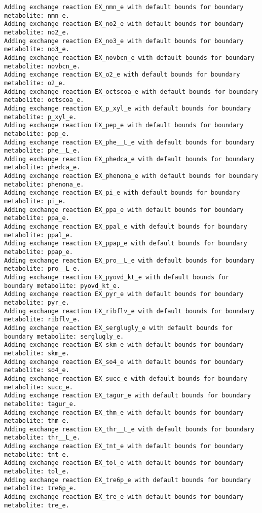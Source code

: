 \documentclass[
  letterpaper,
  DIV=11,
  numbers=noendperiod]{scrartcl}
\begin{document}
\begin{verbatim}
Adding exchange reaction EX_nmn_e with default bounds for boundary metabolite: nmn_e.
Adding exchange reaction EX_no2_e with default bounds for boundary metabolite: no2_e.
Adding exchange reaction EX_no3_e with default bounds for boundary metabolite: no3_e.
Adding exchange reaction EX_novbcn_e with default bounds for boundary metabolite: novbcn_e.
Adding exchange reaction EX_o2_e with default bounds for boundary metabolite: o2_e.
Adding exchange reaction EX_octscoa_e with default bounds for boundary metabolite: octscoa_e.
Adding exchange reaction EX_p_xyl_e with default bounds for boundary metabolite: p_xyl_e.
Adding exchange reaction EX_pep_e with default bounds for boundary metabolite: pep_e.
Adding exchange reaction EX_phe__L_e with default bounds for boundary metabolite: phe__L_e.
Adding exchange reaction EX_phedca_e with default bounds for boundary metabolite: phedca_e.
Adding exchange reaction EX_phenona_e with default bounds for boundary metabolite: phenona_e.
Adding exchange reaction EX_pi_e with default bounds for boundary metabolite: pi_e.
Adding exchange reaction EX_ppa_e with default bounds for boundary metabolite: ppa_e.
Adding exchange reaction EX_ppal_e with default bounds for boundary metabolite: ppal_e.
Adding exchange reaction EX_ppap_e with default bounds for boundary metabolite: ppap_e.
Adding exchange reaction EX_pro__L_e with default bounds for boundary metabolite: pro__L_e.
Adding exchange reaction EX_pyovd_kt_e with default bounds for boundary metabolite: pyovd_kt_e.
Adding exchange reaction EX_pyr_e with default bounds for boundary metabolite: pyr_e.
Adding exchange reaction EX_ribflv_e with default bounds for boundary metabolite: ribflv_e.
Adding exchange reaction EX_serglugly_e with default bounds for boundary metabolite: serglugly_e.
Adding exchange reaction EX_skm_e with default bounds for boundary metabolite: skm_e.
Adding exchange reaction EX_so4_e with default bounds for boundary metabolite: so4_e.
Adding exchange reaction EX_succ_e with default bounds for boundary metabolite: succ_e.
Adding exchange reaction EX_tagur_e with default bounds for boundary metabolite: tagur_e.
Adding exchange reaction EX_thm_e with default bounds for boundary metabolite: thm_e.
Adding exchange reaction EX_thr__L_e with default bounds for boundary metabolite: thr__L_e.
Adding exchange reaction EX_tnt_e with default bounds for boundary metabolite: tnt_e.
Adding exchange reaction EX_tol_e with default bounds for boundary metabolite: tol_e.
Adding exchange reaction EX_tre6p_e with default bounds for boundary metabolite: tre6p_e.
Adding exchange reaction EX_tre_e with default bounds for boundary metabolite: tre_e.

\end{verbatim}
\end{document}
